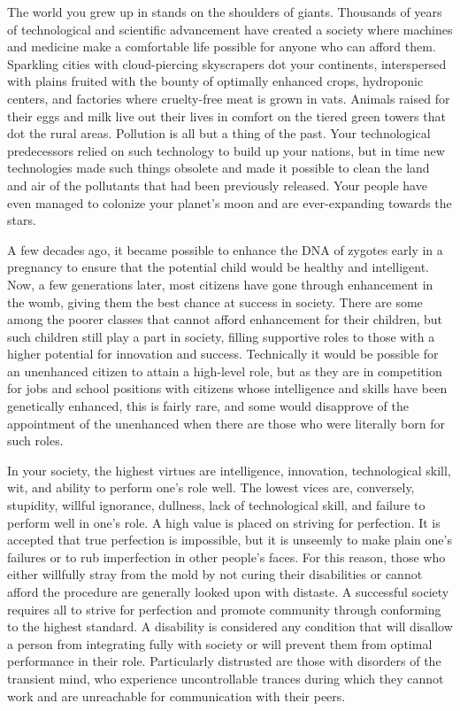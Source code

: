 \documentclass[blue]{guildcamp3}
\begin{document}
\name{\bTechWorld{}}

The world you grew up in stands on the shoulders of giants. Thousands of years of technological and scientific advancement have created a society where machines and medicine make a comfortable life possible for anyone who can afford them. Sparkling cities with cloud-piercing skyscrapers dot your continents, interspersed with plains fruited with the bounty of optimally enhanced crops, hydroponic centers, and factories where cruelty-free meat is grown in vats. Animals raised for their eggs and milk live out their lives in comfort on the tiered green towers that dot the rural areas. Pollution is all but a thing of the past. Your technological predecessors relied on such technology to build up your nations, but in time new technologies made such things obsolete and made it possible to clean the land and air of the pollutants that had been previously released. Your people have even managed to colonize your planet's moon and are ever-expanding towards the stars.

A few decades ago, it became possible to enhance the DNA of zygotes early in a pregnancy to ensure that the potential child would be healthy and intelligent. Now, a few generations later, most citizens have gone through enhancement in the womb, giving them the best chance at success in society. There are some among the poorer classes that cannot afford enhancement for their children, but such children still play a part in society, filling supportive roles to those with a higher potential for innovation and success. Technically it would be possible for an unenhanced citizen to attain a high-level role, but as they are in competition for jobs and school positions with citizens whose intelligence and skills have been genetically enhanced, this is fairly rare, and some would disapprove of the appointment of the unenhanced when there are those who were literally born for such roles.

In your society, the highest virtues are intelligence, innovation, technological skill, wit, and ability to perform one's role well. The lowest vices are, conversely, stupidity, willful ignorance, dullness, lack of technological skill, and failure to perform well in one's role. A high value is placed on striving for perfection. It is accepted that true perfection is impossible, but it is unseemly to make plain one's failures or to rub imperfection in other people's faces. For this reason, those who either willfully stray from the mold by not curing their disabilities or cannot afford the procedure are generally looked upon with distaste. A successful society requires all to strive for perfection and promote community through conforming to the highest standard. A disability is considered any condition that will disallow a person from integrating fully with society or will prevent them from optimal performance in their role. Particularly distrusted are those with disorders of the transient mind, who experience uncontrollable trances during which they cannot work and are unreachable for communication with their peers.
\end{document}
